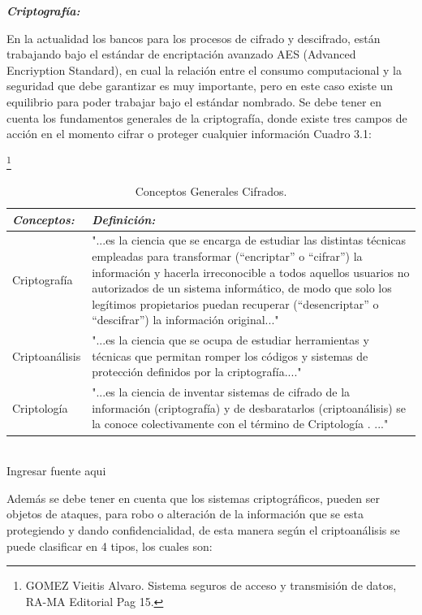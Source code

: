 \documentclass[a4paper,openright,12pt]{book}
\theoremstyle{definition}
\theoremstyle{remark}
\begin{document}
\textbf{\textit{Criptografía:}}

En la actualidad los bancos para los procesos de cifrado y descifrado, están trabajando bajo el estándar de encriptación avanzado AES (Advanced Encriyption Standard), en cual la relación entre el consumo computacional y la seguridad que debe garantizar es muy importante, pero en este caso existe un equilibrio para poder trabajar bajo el estándar nombrado. Se debe tener en cuenta los fundamentos generales de la criptografía, donde existe tres campos de acción en el momento cifrar o proteger cualquier información Cuadro 3.1: 

\begin{table}[ht]
\centering
\caption{Conceptos Generales Cifrados.}\footnote{GOMEZ Vieitis Alvaro. Sistema seguros de acceso y transmisión de datos, RA-MA Editorial Pag 15.}
\begin{tabular}{>{\centering\arraybackslash}m{3cm} >{\arraybackslash}m{9cm} }
\hline
\textbf{\textit{Conceptos:}} & \textbf{\textit{Definición:}} \\ \hline
Criptografía & "...es la ciencia que se encarga de estudiar las distintas técnicas empleadas para transformar (“encriptar” o “cifrar”) la información y hacerla irreconocible a todos aquellos usuarios no autorizados de un sistema informático, de modo que solo los legítimos propietarios puedan recuperar (“desencriptar” o “descifrar”) la información original..." \\ \hline
Criptoanálisis & "...es la ciencia que se ocupa de estudiar herramientas y técnicas que permitan romper los códigos y sistemas de protección definidos por la criptografía...." \\ \hline
Criptología & "...es la ciencia de inventar sistemas de cifrado de la información (criptografía) y de desbaratarlos (criptoanálisis) se la conoce colectivamente con el término de Criptología . ..." \\ \hline
\end{tabular}
\label{tabla:ConceptosCriptograficos}
\\Ingresar fuente aqui
\end{table}

Además se debe tener en cuenta que los sistemas criptográficos, pueden ser objetos de ataques, para robo o alteración de la información que se esta protegiendo y dando confidencialidad, de esta manera según el criptoanálisis se puede clasificar en 4 tipos, los cuales son:
\end{document}
